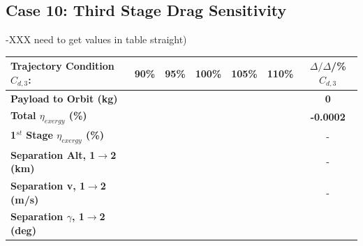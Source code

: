 \subsection{Case 10: Third Stage Drag Sensitivity}
-XXX need to get values in table straight)
\begin{table}[ht] %
	\centering
	\begin{tabular}{l c c c c c c} 
		\hline \textbf{Trajectory Condition}   \qquad  $C_{d,3}$:
		&90\%
		&95\%
		&100\%
		&105\%
		&110\%
		& $\Delta/\Delta$/\%$C_{d,3}$
			\\
			\hline \textbf{Payload to Orbit (kg)}
			& \textbf{\PayloadToOrbitCdThreeNinetyNoReturn}
			& \textbf{\PayloadToOrbitCdThreeNinetyFiveNoReturn}
			& \textbf{\PayloadToOrbitCdThreeStandardNoReturn}
			& \textbf{\PayloadToOrbitCdThreeOneOneHundredFiveNoReturn}
			& \textbf{\PayloadToOrbitCdThreeOneHundredTenNoReturn}
			& \textbf{0}
			\\
			\textbf{Total $\eta_{exergy}$ (\%)}
			& \textbf{\totalExergyEffCdThreeNinetyNoReturn}
			& \textbf{\totalExergyEffCdThreeNinetyFiveNoReturn}
			& \textbf{\totalExergyEffCdThreeStandardNoReturn}
			& \textbf{\totalExergyEffCdThreeOneOneHundredFiveNoReturn}
			& \textbf{\totalExergyEffCdThreeOneHundredTenNoReturn}
			& \textbf{-0.0002}
			\\
			\hline 
			\textbf{1$^{st}$ Stage $\eta_{exergy}$ (\%)}
			& \textbf{\firstExergyEffCdThreeNinetyNoReturn}
			& \textbf{\firstExergyEffCdThreeNinetyFiveNoReturn}
			& \textbf{\firstExergyEffCdThreeStandardNoReturn}
			& \textbf{\firstExergyEffCdThreeOneOneHundredFiveNoReturn}
			& \textbf{\firstExergyEffCdThreeOneHundredTenNoReturn}
			& -
			\\
			\textbf{Separation Alt, 1$\rightarrow$2 (km)}
			& \firstsecondSeparationAltCdThreeNinetyNoReturn
			& \firstsecondSeparationAltCdThreeNinetyFiveNoReturn
			& \firstsecondSeparationAltCdThreeStandardNoReturn
			& \firstsecondSeparationAltCdThreeOneOneHundredFiveNoReturn
			& \firstsecondSeparationAltCdThreeOneHundredTenNoReturn
			& -
			\\
			\textbf{Separation v, 1$\rightarrow$2 (m/s)}
			& \firstsecondSeparationvCdThreeNinetyNoReturn
			& \firstsecondSeparationvCdThreeNinetyFiveNoReturn
			& \firstsecondSeparationvCdThreeStandardNoReturn
			& \firstsecondSeparationvCdThreeOneOneHundredFiveNoReturn
			& \firstsecondSeparationvCdThreeOneHundredTenNoReturn
			& -
			\\
			\textbf{Separation $\gamma$, 1$\rightarrow$2 (deg)}
			& \firstsecondSeparationgammaCdThreeNinetyNoReturn

\end{tabular}
\end{table}
